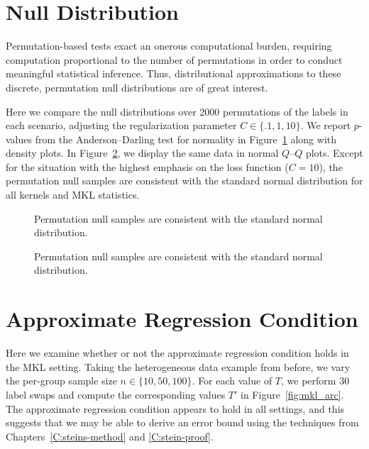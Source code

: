 \section{Null Distribution}
Permutation-based tests exact an onerous computational burden, requiring computation
proportional to the number of permutations in order to conduct meaningful statistical
inference.  Thus, distributional approximations to these discrete, permutation null
distributions are of great interest.

Here we compare the null distributions over 2000 permutations of the
labels in each scenario, adjusting the regularization parameter $C \in
\{.1, 1, 10\}$.  We report $p$-values from the Anderson--Darling test
for normality in Figure~\ref{fig:mkl_null} along with density plots.
In Figure~\ref{fig:mkl_null_qq}, we display the same data in normal
$Q$--$Q$ plots.  Except for the situation with the highest emphasis on
the loss function ($C=10$), the permutation null samples are
consistent with the standard normal distribution for all kernels and
MKL statistics.
\begin{figure}
  \begin{center}
    \resizebox{14.0cm}{!}{
      
    }
  \end{center}
\caption{Permutation null samples are consistent with the standard normal distribution.}
\label{fig:mkl_null}
\end{figure}

\begin{figure}
  \begin{center}
    \resizebox{14.0cm}{!}{
      
    }
  \end{center}
\caption{Permutation null samples are consistent with the standard normal distribution.}
\label{fig:mkl_null_qq}
\end{figure}

\section{Approximate Regression Condition}
Here we examine whether or not the approximate regression condition
holds in the MKL setting.
Taking the heterogeneous data example from before, we vary the
per-group sample size $n \in \{10, 50, 100\}$.  For each value of $T$,
we perform $30$ label swaps and compute the corresponding values $T'$
in Figure~\ref{fig:mkl_arc}.  The approximate regression condition
appears to hold in all settings, and this suggests that we may be able to derive
an error bound using the techniques from
Chapters~\ref{C:steins-method} and \ref{C:stein-proof}.

